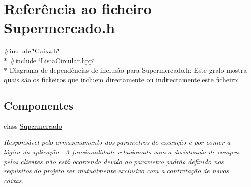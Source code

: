 \hypertarget{a00019}{\section{Referência ao ficheiro Supermercado.\+h}
\label{a00019}
}
{\ttfamily \#include \char`\"{}Caixa.\+h\char`\"{}}\\*
{\ttfamily \#include \char`\"{}Lista\+Circular.\+hpp\char`\"{}}\\*
Diagrama de dependências de inclusão para Supermercado.\+h\+:
Este grafo mostra quais são os ficheiros que incluem directamente ou indirectamente este ficheiro\+:
\subsection*{Componentes}
\begin{DoxyCompactItemize}
\item 
class \hyperlink{a00005}{Supermercado}
\begin{DoxyCompactList}\small\item\em Responsável pelo armazenamento dos parametros de execução e por conter a lógica da aplicação~\newline
 A funcionalidade relacionada com a desistencia de compra pelos clientes não está ocorrendo devido ao parametro padrão definido nos requisitos do projeto ser mutualmente exclusivo com a contratação de novos caixas. \end{DoxyCompactList}\end{DoxyCompactItemize}
